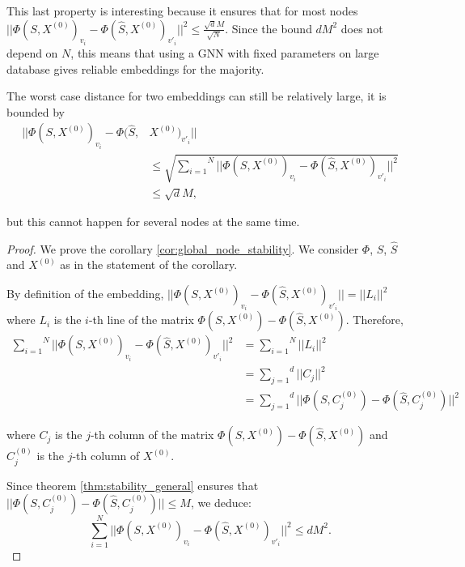 \documentclass[11pt,a4paper]{article}
\newcommand{\Sum}[2]{\overset{#2}{\underset{#1}{\sum}}}
\theoremstyle{definition}
\renewcommand{\leq}{\leqslant}
\begin{document}
        This last property is interesting because it ensures that for most nodes $ || \Phi(S, X^{(0)})_{v_i} - \Phi(\hat{S}, X ^{(0)})_{v'_i} ||^2 \leq \frac{\sqrt{d} M}{\sqrt{N}}$. Since the bound $d M^2$ does not depend on $N$, this means that using a GNN with fixed parameters on large database gives reliable embeddings for the majority.

        The worst case distance for two embeddings can still be relatively large, it is bounded by 
        \begin{align*}
            || \Phi(S, X^{(0)})_{v_i} - \Phi(\hat{S}, &X ^{(0)})_{v'_i} || \\
            &\leq \sqrt{\Sum{i=1}{N} || \Phi(S, X^{(0)})_{v_i} - \Phi(\hat{S}, X ^{(0)})_{v'_i} ||^2} \\
            &\leq \sqrt{d}M,
        \end{align*} 

        but this cannot happen for several nodes at the same time.

        \begin{proof}
            We prove the corollary \ref{cor:global_node_stability}. We consider $\Phi$, $S$, $\hat{S}$ and $X^{(0)}$ as in the statement of the corollary.

            By definition of the embedding, $|| \Phi(S, X^{(0)})_{v_i} - \Phi(\hat{S}, X ^{(0)})_{v'_i} || = || L_i || ^2$ where $L_i$ is the $i$-th line of the matrix $\Phi(S,X^{(0)}) - \Phi(\hat{S},X^{(0)})$. Therefore, 
            \begin{align*}
                \Sum{i=1}{N} || \Phi(S, X^{(0)})_{v_i} - \Phi(\hat{S}, X ^{(0)})_{v'_i} ||^2 &= \Sum{i=1}{N} || L_i ||^2 \\
                &= \Sum{j=1}{d} || C_j ||^2 \\
                &= \Sum{j=1}{d} || \Phi(S,C^{(0)}_j) - \Phi(\hat{S},C^{(0)}_j) ||^2 
            \end{align*}

            where $C_j$ is the $j$-th column of the matrix $\Phi(S,X^{(0)}) - \Phi(\hat{S},X^{(0)})$ and $C^{(0)}_j$ is the $j$-th column of $X^{(0)}$.

            Since theorem \ref{thm:stability_general} ensures that $ || \Phi(S,C^{(0)}_j) - \Phi(\hat{S},C^{(0)}_j) || \leq M $, we deduce:
            $$ \Sum{i=1}{N} || \Phi(S, X^{(0)})_{v_i} - \Phi(\hat{S}, X ^{(0)})_{v'_i} ||^2 \leq d M^2. $$

        \end{proof}
\end{document}
